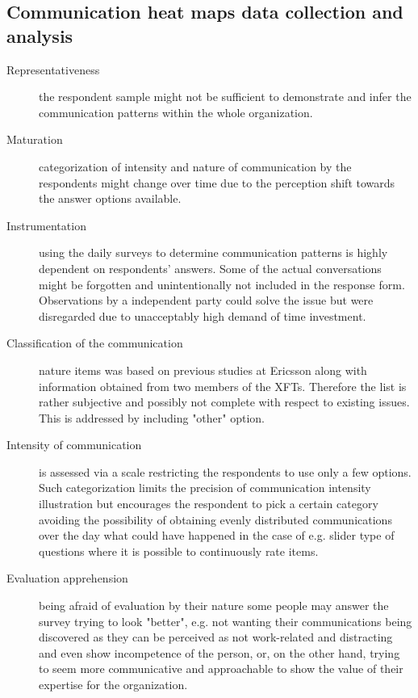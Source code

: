 \subsection{Communication heat maps data collection and analysis}

\begin{description}
    \item[Representativeness] the respondent sample might not be sufficient to demonstrate and infer the communication patterns within the whole organization.
    \item[Maturation] categorization of intensity and nature of communication by the respondents might change over time due to the perception shift towards the answer options available.
    \item[Instrumentation] using the daily surveys to determine communication patterns is highly dependent on respondents' answers. Some of the actual conversations might be forgotten and unintentionally not included in the response form. Observations by a independent party could solve the issue but were disregarded due to unacceptably high demand of time investment.
    \item[Classification of the communication] nature items was based on previous studies at Ericsson along with information obtained from two members of the \ac{XFT}s. Therefore the list is rather subjective and possibly not complete with respect to existing issues. This is addressed by including "other" option. 
    \item[Intensity of communication] is assessed via a scale restricting the respondents to use only a few options. Such categorization limits the precision of communication intensity illustration but encourages the respondent to pick a certain category avoiding the possibility of obtaining evenly distributed communications over the day what could have happened in the case of e.g. slider type of questions where it is possible to continuously rate items.
    \item[Evaluation apprehension] being afraid of evaluation by their nature some people may answer the survey trying to look "better", e.g. not wanting their communications being discovered as they can be perceived as not work-related and distracting and even show incompetence of the person, or, on the other hand, trying to seem more communicative and approachable to show the value of their expertise for the organization.
\end{description}